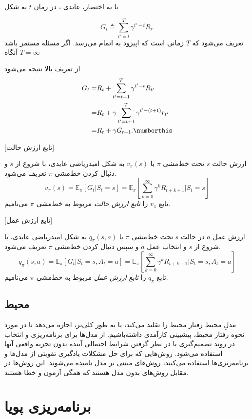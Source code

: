  یا به اختصار، عایدی ، در زمان $t$ به شکل

$$G_t \triangleq \sum_{t'=t}^{T} \gamma^{t'-t} R_{t'}$$
تعریف می‌شود که $T$ زمانی است که اپیزود به اتمام می‌رسد. اگر مسئله مستمر باشد آنگاه 
$T=\infty$

از تعریف بالا نتیجه می‌شود 
\begin{align}
G_t =& R_t + \sum_{t'=t+1}^{T} \gamma^{t'-t} R_{t'} \nonumber \\
=& R_t + \gamma \sum_{t'=t+1}^{T} \gamma^{t' - (t+1)} r_{t'} \nonumber \\
=& R_t + \gamma G_{t+1}. \numberthis
\end{align}

[تابع ارزش حالت]

 ارزش حالت $s$ تحت خط‌مشی $\pi$ یا $v_\pi(s)$ به شکل امیدریاضی عایدی، با شروع از $s$ و دنبال کردن خط‌مشی $\pi$ تعریف می‌شود.
$$v_\pi(s) = \mathbb{E}_\pi\left[G_t| S_t=s\right] = \mathbb{E}_\pi\left[\sum_{k=0}^{\infty} \gamma^k R_{t+k+1}|S_t =s \right]$$
تابع $v_\pi$ را 
\textit{تابع ارزش حالت}
 مربوط به خط‌مشی 
$\pi$
می‌نامیم.

[تابع ارزش عمل]

ارزش عمل  $a$ در حالت
$s$
 تحت خط‌مشی $\pi$ یا 
 $q_\pi(s,a)$
  به شکل امیدریاضی عایدی، با شروع از $s$ و انتخاب عمل $a$  و سپس دنبال کردن خط‌مشی $\pi$ تعریف می‌شود.
$$q_\pi(s,a) = \mathbb{E}_\pi\left[G_t| S_t=s, A_t=a\right] = \mathbb{E}_\pi\left[\sum_{k=0}^{\infty} \gamma^k R_{t+k+1}|S_t =s, A_t=a \right]$$
تابع $q_\pi$ را 
\textit{تابع ارزش عمل}
 مربوط به خط‌مشی 
$\pi$
می‌نامیم.
\subsection{محیط}

مدلِ محیط رفتار محیط را تقلید می‌کند، یا به طور کلی‌تر، اجازه می‌دهد تا در مورد نحوه رفتار محیط، پیشبینی کارآمدی داشته‌باشیم. از مدل‌ها برای برنامه‌ریزی و انتخاب در روند تصمیم‌گیری  با در نظر گرفتن شرایط احتمالی آینده بدون تجربه واقعی آنها استفاده می‌شود.
روش‌هایی که برای حل مشکلات یادگیری تقویتی از مدل‌ها و برنامه‌ریزی‌ها استفاده می‌کنند، روش‌های مبتنی بر مدل نامیده می‌شوند. این روش‌ها در مقابل روش‌های بدون مدل هستند که همگی آزمون و خطا هستند.
\section{برنامه‌ریزی پویا}
